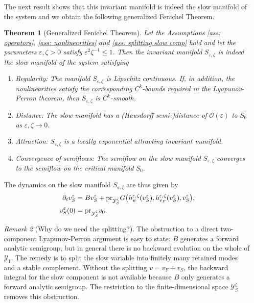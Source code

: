 \documentclass[11pt]{article}
\newtheorem{theorem}{Theorem}[section]
\theoremstyle{definition}
\theoremstyle{remark}
\newtheorem{remark}[theorem]{Remark}
\numberwithin{equation}{section}
\newcommand{\eps}{\varepsilon}
\newcommand{\mc}[1]{\mathcal{#1}}
\newcommand{\pr}{\textnormal{pr}}
\begin{document}
The next result shows that this invariant manifold is indeed the slow manifold of the system and we obtain the following generalized Fenichel Theorem.
\begin{theorem}[Generalized Fenichel Theorem]\label{thm: Fenichel abstract}
   Let the Assumptions \ref{ass: operators}, \ref{ass: nonlinearities} and \ref{ass: splitting slow comp} hold and let the parameters $\varepsilon,\zeta>0$ satisfy $\varepsilon^2\zeta^{-1}\leq1$.
    Then the invariant manifold $S_{\varepsilon,\zeta}$ is indeed the slow manifold of the system satisfying
    \begin{enumerate}
        \item[(i)] Regularity: The manifold \(S_{\varepsilon,\zeta}\) is Lipschitz continuous.
        If, in addition, the nonlinearities satisfy the corresponding \(C^k\)-bounds
        required in the Lyapunov-Perron theorem, then \(S_{\varepsilon,\zeta}\) is
        \(C^k\)-smooth.
        \item[(ii)] Distance: The slow manifold has a (Hausdorff semi-)distance of $\mathcal{O}(\varepsilon)$ to $S_0$ as $\varepsilon,\zeta\to 0$.
        \item[(iii)] Attraction: $S_{\varepsilon,\zeta}$ is a locally exponential attracting invariant manifold.
        \item[(iv)] Convergence of semiflows: The semiflow on the slow manifold $S_{\varepsilon,\zeta}$ converges to the semiflow on the critical manifold $S_0$.
    \end{enumerate}
\end{theorem}
The dynamics on the slow manifold $S_{\varepsilon,\zeta}$ are thus given by
\begin{align}\label{eq: slow dynamics}
\begin{split}
    \partial_t v_S^\eps&= Bv_S^\eps +\pr_{\mc Y_S^\zeta}G\bigl(h^{\eps,\zeta}_{w}(v_S^\eps),h^{\eps,\zeta}_{v_F}(v_S^\eps),v_S^\eps\bigr),\\
    v_S^\eps(0)&=  \pr_{\mc Y_S^\zeta} v_0.
    \end{split}
\end{align}

\begin{remark}[Why do we need the splitting?]\label{rem:why-splitting}
    The obstruction to a direct two-component Lyapunov-Perron argument is easy to state: $B$ generates a forward analytic semigroup, but in general there is no backward evolution on the whole of $\mc Y_1$. The remedy is to split the slow variable into finitely many retained modes and a stable complement.
    Without the splitting $v=v_F+v_S$, the backward integral for the slow component is not available because $B$ only generates a forward analytic semigroup. The restriction to the finite-dimensional space $\mc Y_S^\zeta$ removes this obstruction.
\end{remark}
\end{document}
